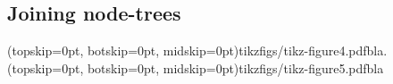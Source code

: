 \subsection{Joining node-trees}\label{sec:nodejoin}


\Figure[htb](topskip=0pt, botskip=0pt, midskip=0pt){tikzfigs/tikz-figure4.pdf}{bla.\label{fig4}}
\Figure[htb](topskip=0pt, botskip=0pt, midskip=0pt){tikzfigs/tikz-figure5.pdf}{bla\label{fig5}}

